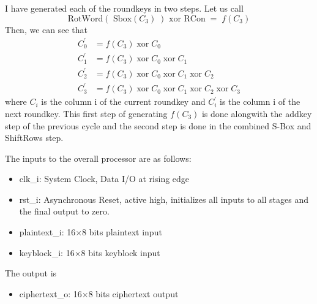 \documentclass[a4paper]{article}
\begin{document}
I have generated each of the roundkeys in two steps. Let us call
\[
\text{RotWord}(\text{ Sbox}(C_3)\;)\text{ xor RCon}\; = \;f(C_3)
\]
Then, we can see that
\begin{equation*}
\begin{aligned}
C_0^\prime &= f(C_3) \;\text{xor}\; C_0 \\
C_1^\prime &= f(C_3) \;\text{xor}\; C_0 \;\text{xor}\; C_1 \\
C_2^\prime &= f(C_3) \;\text{xor}\; C_0 \;\text{xor}\; C_1 \;\text{xor}\; C_2 \\
C_3^\prime &= f(C_3) \;\text{xor}\; C_0 \;\text{xor}\; C_1 \;\text{xor}\; C_2 \;\text{xor}\; C_3
\end{aligned}
\end{equation*}
where $C_i$ is the column i of the current roundkey and $C_i^\prime$ is the column i of the next roundkey.
This first step of generating $f(C_3)$ is done alongwith the addkey step of the previous cycle and the second step is done in the combined S-Box and ShiftRows step.

The inputs to the overall processor are as follows:
\begin{itemize}
\item clk\_i: System Clock, Data I/O at rising edge
\item rst\_i: Asynchronous Reset, active high, initializes all inputs to all stages and the final output to zero.
\item plaintext\_i: 16$\times$8 bits plaintext input
\item keyblock\_i: 16$\times$8 bits keyblock input
\end{itemize}
The output is 
\begin{itemize}
\item ciphertext\_o: 16$\times$8 bits ciphertext output
\end{itemize}
\end{document}
